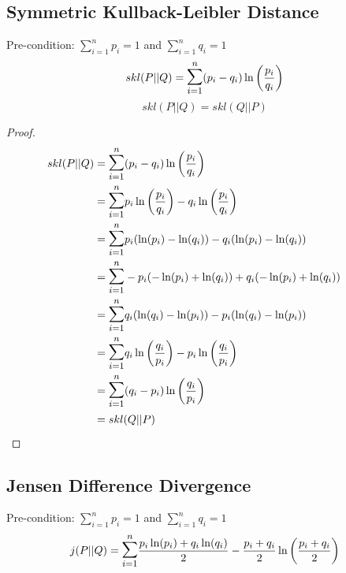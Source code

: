 \documentclass[10pt,a4paper]{article}
\begin{document}
\subsection{Symmetric Kullback-Leibler Distance}
Pre-condition: $\sum\limits_{i=1}^n p_i = 1$ and $\sum\limits_{i=1}^n q_i = 1$
\begin{equation}
  skl(P||Q) = \mathlarger{\mathlarger{\sum}}\limits_{i=1}^n (p_i-q_i) \ln \left(\frac{p_i}{q_i}\right)
\end{equation}
\begin{equation}
  skl(P||Q) = skl(Q||P)
\end{equation}
\begin{proof}
\begin{align*}
  skl(P||Q)  &= \mathlarger{\mathlarger{\sum}}\limits_{i=1}^n (p_i-q_i) \ln \left(\frac{p_i}{q_i}\right) \\
            &= \mathlarger{\mathlarger{\sum}}\limits_{i=1}^n p_i \ln \left(\frac{p_i}{q_i}\right) - q_i \ln \left(\frac{p_i}{q_i}\right) \\
            &= \mathlarger{\mathlarger{\sum}}\limits_{i=1}^n p_i( \ln(p_i) - \ln(q_i) ) - q_i( \ln(p_i) - \ln(q_i) ) \\
            &= \mathlarger{\mathlarger{\sum}}\limits_{i=1}^n -p_i( -\ln(p_i) + \ln(q_i) ) + q_i( -\ln(p_i) + \ln(q_i) ) \\
            &= \mathlarger{\mathlarger{\sum}}\limits_{i=1}^n q_i( \ln(q_i) - \ln(p_i) ) - p_i( \ln(q_i) - \ln(p_i) ) \\
            &= \mathlarger{\mathlarger{\sum}}\limits_{i=1}^n q_i \ln \left(\frac{q_i}{p_i}\right) - p_i \ln \left(\frac{q_i}{p_i}\right) \\
            &= \mathlarger{\mathlarger{\sum}}\limits_{i=1}^n (q_i - p_i) \ln \left(\frac{q_i}{p_i}\right) \\
            &= skl(Q||P) && \qedhere
\end{align*}
\end{proof}


\subsection{Jensen Difference Divergence}
Pre-condition: $\sum\limits_{i=1}^n p_i = 1$ and $\sum\limits_{i=1}^n q_i = 1$
\begin{equation}
  j(P||Q) = \mathlarger{\mathlarger{\sum}}\limits_{i=1}^n \frac{p_i \ln(p_i) + q_i \ln(q_i)}{2} - \frac{p_i+q_i}{2} \ln\left( \frac{p_i+q_i}{2} \right)
\end{equation}
\end{document}
